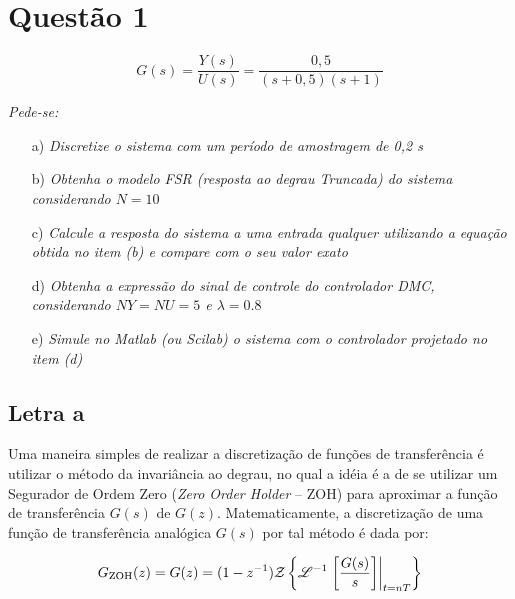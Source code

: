 \chapter*{Questão 1}

\begin{equation}\nonumber
G(s) = \frac{Y(s)}{U(s)} = \frac{0,5}{(s+0,5)(s+1)}
\end{equation}

{\it Pede-se:}

\begin{itemize}
    \item[a)] {\it Discretize o sistema com um período de amostragem de 0,2 s}
    \item[b)] {\it Obtenha o modelo FSR (resposta ao degrau Truncada) do sistema
              considerando $N = 10$}
    \item[c)] {\it Calcule a resposta do sistema a uma entrada qualquer
              utilizando a equação obtida no item (b) e compare com o seu valor 
              exato}
    \item[d)] {\it Obtenha a expressão do sinal de controle do controlador DMC,
              considerando $NY = NU = 5$ e $\lambda = 0.8$}
    \item[e)] {\it Simule no Matlab (ou Scilab) o sistema com o controlador
              projetado no item (d)}
\end{itemize}

\vspace{0.5cm}


\vspace{0.25cm}

\section*{Letra a}
Uma maneira simples de realizar a discretização de funções de transferência é
utilizar o método da invariância ao degrau, no qual a idéia é a de se utilizar
um Segurador de Ordem Zero ({\it Zero Order Holder} -- ZOH) para aproximar a
função de transferência $G(s)$ de $G(z)$. Matematicamente, a discretização de
uma função de transferência analógica $G(s)$ por tal método é dada por:

\begin{equation}\label{eq:Gzoh}
G_{\text{ZOH}}(z) = 
G(z) = (1 - z^{-1})
       \mathcal{Z}\left\{\mathscr{L}^{-1}\left.\left[\frac{G(s)}{s}\right]\right|_{t = nT}\right\}
\end{equation}

